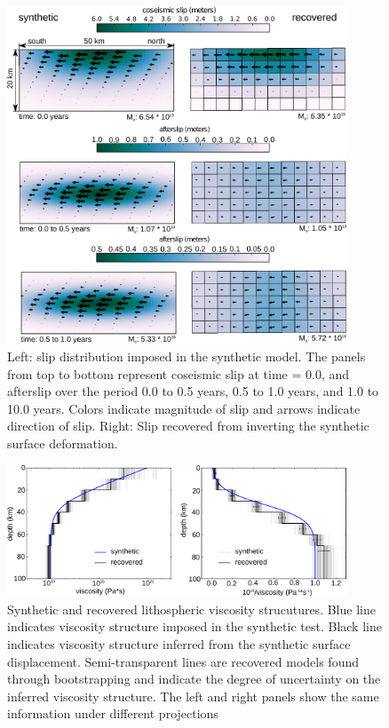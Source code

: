 \documentclass[fleqn,12pt]{article}
\begin{document}
\begin{figure}[h!]\label{figure2}
  \centering
  \includegraphics[width=0.9\textwidth]{FinalFigures/Figure2.pdf}
  \caption{Left: slip distribution imposed in the synthetic model.
    The panels from top to bottom represent coseismic slip at time =
    0.0, and afterslip over the period 0.0 to 0.5 years, 0.5 to 1.0
    years, and 1.0 to 10.0 years.  Colors indicate magnitude of slip
    and arrows indicate direction of slip.  Right: Slip recovered from
    inverting the synthetic surface deformation.}
  \label{figure 2}
\end{figure}

\begin{figure}[h!]\label{figure3}
  \centering
  \includegraphics[width=0.9\textwidth]{FinalFigures/Figure3.pdf}
  \caption{Synthetic and recovered lithospheric viscosity strucutures.
    Blue line indicates viscosity structure imposed in the synthetic
    test. Black line indicates viscosity structure inferred from the
    synthetic surface displacement.  Semi-transparent lines are
    recovered models found through bootstrapping and indicate the
    degree of uncertainty on the inferred viscosity structure.  The
    left and right panels show the same information under
    different projections}
  \label{figure 3}
\end{figure}
\end{document}

